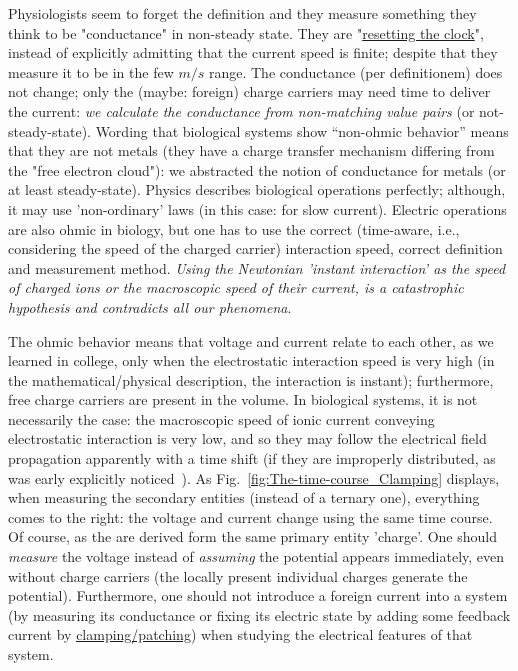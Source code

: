 Physiologists seem to forget the definition and they measure something they think to be  "conductance" in non-steady state. They are "\hyperlink{ResettingClock}
{resetting the clock}",
instead of explicitly admitting that the current speed is finite;
despite that they measure it to be in the few $m/s$ range.
The conductance (per definitionem) does not change; only the (maybe:
foreign) charge carriers may need time to deliver the current:
\emph{we calculate the conductance from non-matching value pairs} (or not-steady-state).
Wording that biological systems show ``non-ohmic behavior''
means that they are not metals (they have a charge transfer mechanism differing from the "free electron cloud"): we abstracted the notion of conductance
for metals (or at least steady-state).
Physics describes biological operations perfectly; although, it may use 'non-ordinary' laws (in this case: for slow current). Electric
operations are also ohmic in biology, but one has to use the correct
(time-aware, i.e., considering the speed of the charged carrier) interaction
speed, correct definition and measurement method. \emph{Using the Newtonian 'instant interaction' as the speed
	of charged ions or the macroscopic speed of their current,
	 is a catastrophic
	hypothesis and contradicts all our phenomena}. 

The ohmic behavior means that voltage and current relate to each other,
as we learned in college, only when the electrostatic interaction
speed is very high (in the mathematical/physical description, the
interaction is instant); furthermore, free charge carriers are present in the volume. In biological systems, it is not necessarily
the case: the macroscopic speed of ionic
current conveying electrostatic interaction is very low, and so they
may follow the electrical field propagation apparently with a time shift
(if they are improperly distributed, as was early explicitly noticed~\cite{HodgkinHuxley:1952}).
As Fig.~\ref{fig:The-time-course_Clamping} displays, when
measuring the secondary entities (instead of a ternary one), everything
comes to the right: the voltage and current change using the same
time course. Of course, as the are derived form the same primary entity 'charge'. One should \emph{measure} the voltage instead of \emph{assuming}
the potential appears immediately, even without charge carriers (the locally present individual charges generate the potential).
Furthermore, one should not introduce a foreign current into a system
(by measuring its conductance or fixing its electric state by
adding some feedback current by \hyperlink{voltage-clamping}{clamping/patching}) when studying the electrical features of that system.

